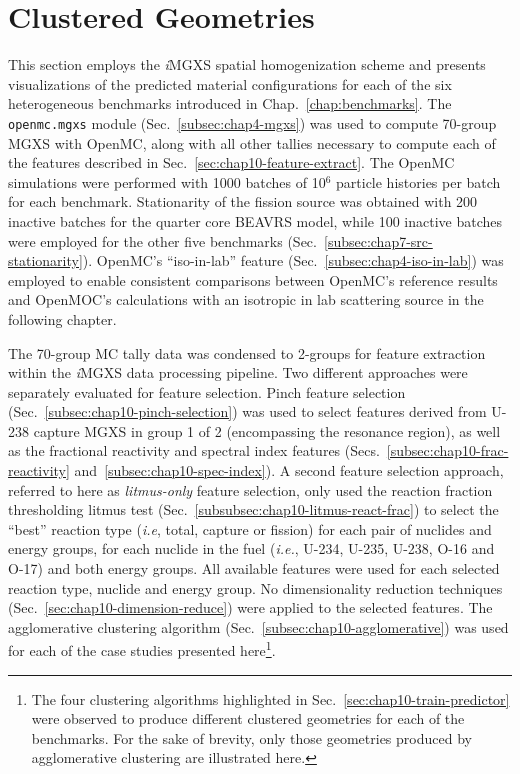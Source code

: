
\section{Clustered Geometries}
\label{sec:chap10-cluster-geometries}

This section employs the \textit{i}\ac{MGXS} spatial homogenization scheme and presents visualizations of the predicted material configurations for each of the six heterogeneous benchmarks introduced in Chap.~\ref{chap:benchmarks}. The \texttt{openmc.mgxs} module (Sec.~\ref{subsec:chap4-mgxs}) was used to compute 70-group \ac{MGXS} with OpenMC, along with all other tallies necessary to compute each of the features described in Sec.~\ref{sec:chap10-feature-extract}. The OpenMC simulations were performed with 1000 batches of 10$^{6}$ particle histories per batch for each benchmark. Stationarity of the fission source was obtained with 200 inactive batches for the quarter core \ac{BEAVRS} model, while 100 inactive batches were employed for the other five benchmarks (Sec.~\ref{subsec:chap7-src-stationarity}). OpenMC's ``iso-in-lab'' feature (Sec.~\ref{subsec:chap4-iso-in-lab}) was employed to enable consistent comparisons between OpenMC's reference results and OpenMOC's calculations with an isotropic in lab scattering source in the following chapter.

The 70-group \ac{MC} tally data was condensed to 2-groups for feature extraction within the \textit{i}\ac{MGXS} data processing pipeline. Two different approaches were separately evaluated for feature selection. Pinch feature selection (Sec.~\ref{subsec:chap10-pinch-selection}) was used to select features derived from U-238 capture \ac{MGXS} in group 1 of 2 (encompassing the resonance region), as well as the fractional reactivity and spectral index features (Secs.~\ref{subsec:chap10-frac-reactivity} and~\ref{subsec:chap10-spec-index}). A second feature selection approach, referred to here as \textit{litmus-only} feature selection, only used the reaction fraction thresholding litmus test (Sec.~\ref{subsubsec:chap10-litmus-react-frac}) to select the ``best'' reaction type (\textit{i.e}, total, capture or fission) for each pair of nuclides and energy groups, for each nuclide in the fuel (\textit{i.e.}, U-234, U-235, U-238, O-16 and O-17) and both energy groups. All available features were used for each selected reaction type, nuclide and energy group. No dimensionality reduction techniques (Sec.~\ref{sec:chap10-dimension-reduce}) were applied to the selected features. The agglomerative clustering algorithm (Sec.~\ref{subsec:chap10-agglomerative}) was used for each of the case studies presented here\footnote{The four clustering algorithms highlighted in Sec.~\ref{sec:chap10-train-predictor} were observed to produce different clustered geometries for each of the benchmarks. For the sake of brevity, only those geometries produced by agglomerative clustering are illustrated here.}. 

